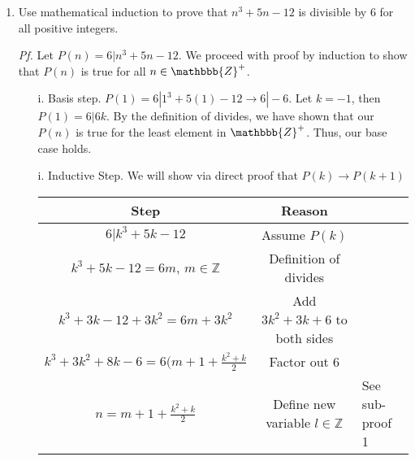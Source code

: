 \begin{enumerate}

















    

\item Use mathematical induction to prove that $n^3 +5n -12$ is divisible by $6$ for all positive integers. 

\begin{solution}
\newline
\textit{Pf.} Let $P(n) = 6 | n^3 + 5n - 12$. We proceed with proof by induction to show that $P(n)$ is true for all $n \in \mathbbb{Z}^+$.
\begin{enumerate}
    \item[i.] Basis step. $P(1) = 6 | 1^3 + 5(1) -12 \rightarrow 6 | -6$. Let $k=-1$, then $P(1) = 6|6k$. By the definition of divides, we have shown that our $P(n)$ is true for the least element in $\mathbbb{Z}^+$. Thus, our base case holds.
    \item[i.] Inductive Step. We will show via direct proof that $P(k) \rightarrow P(k+1)$
    \begin{tabular}{c|c}
        Step & Reason \\
        \hline
        $6 | k^3 + 5k - 12$ & Assume $P(k)$ \\
        $k^3 + 5k -12 = 6m$, $m \in \mathbb{Z}$ & Definition of divides\\
        $k^3+3k-12+3k^2=6m+3k^2$ & Add $3k^2+3k+6$ to both sides \\
        $k^3+3k^2+8k-6 = 6(m+1+\frac{k^2+k}{2}$ & Factor out 6 \\
        $n = m+1+\frac{k^2+k}{2}$ & Define new variable
        $l \in \mathbb{Z}$ & See sub-proof 1
        

\end{tabular}
\end{enumerate}
\end{solution}
\end{enumerate}
